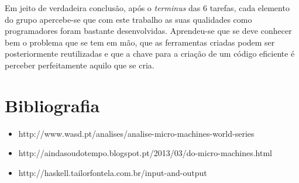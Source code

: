 \documentclass[a4paper]{report} %
\begin{document}
Em jeito de verdadeira conclusão, após o \textit{terminus} das 6 tarefas, cada elemento do grupo apercebe-se que com este trabalho as suas qualidades como programadores foram bastante desenvolvidas. Aprendeu-se que se deve conhecer bem o problema que se tem em mão, que as ferramentas criadas podem ser posteriormente reutilizadas e que a chave para a criação de um código eficiente é perceber perfeitamente aquilo que se cria.





\newpage

\chapter{Bibliografia}   

\begin{itemize}
   
     \item http://www.wasd.pt/analises/analise-micro-machines-world-series
     \item http://aindasoudotempo.blogspot.pt/2013/03/do-micro-machines.html
     \item http://haskell.tailorfontela.com.br/input-and-output

\end{itemize}
\end{document}
